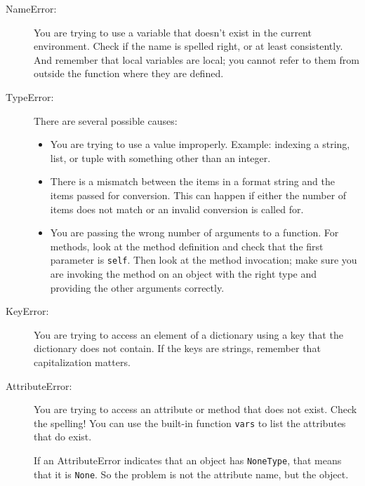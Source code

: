 \begin{description}

\item[NameError:]  You are trying to use a variable that doesn't
exist in the current environment.  Check if the name
is spelled right, or at least consistently.
And remember that local variables are local; you
cannot refer to them from outside the function where they are defined.

\item[TypeError:] There are several possible causes:

\begin{itemize}

\item  You are trying to use a value improperly.  Example: indexing
a string, list, or tuple with something other than an integer.

\item There is a mismatch between the items in a format string and
the items passed for conversion.  This can happen if either the number
of items does not match or an invalid conversion is called for.

\item You are passing the wrong number of arguments to a function.
For methods, look at the method definition and
check that the first parameter is {\tt self}.  Then look at the
method invocation; make sure you are invoking the method on an
object with the right type and providing the other arguments
correctly.

\end{itemize}

\item[KeyError:]  You are trying to access an element of a dictionary
using a key that the dictionary does not contain.  If the keys
are strings, remember that capitalization matters.

\item[AttributeError:] You are trying to access an attribute or method
  that does not exist.  Check the spelling!  You can use the built-in
  function {\tt vars} to list the attributes that do exist.

If an AttributeError indicates that an object has {\tt NoneType},
that means that it is {\tt None}.  So the problem is not the
attribute name, but the object.


\end{description}
